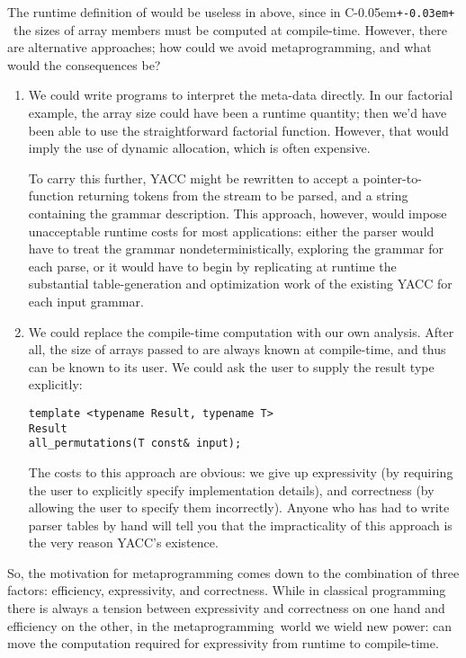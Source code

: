 \documentclass{netobjectdays}
\newcommand{\Cpp}{C\kern-0.05em\texttt{+\kern-0.03em+}%
}
\newcommand{\mping}{meta\-program\-ming}
\begin{document}
The runtime definition of  would be useless in
 above, since in \Cpp\ the sizes of array
members must be computed at compile-time. However, there are
alternative approaches; how could we avoid \mping, and what would the
consequences be?

\begin{enumerate}

\item We could write programs to interpret the meta-data directly. In
  our factorial example, the array size could have been a runtime
  quantity; then we'd have been able to use the straightforward
  factorial function. However, that would imply the use of dynamic
  allocation, which is often expensive.

  To carry this further, YACC might be rewritten to accept a
  pointer-to-function returning tokens from the stream to be parsed,
  and a string containing the grammar description. This approach,
  however, would impose unacceptable runtime costs for most
  applications: either the parser would have to treat the grammar
  nondeterministically, exploring the grammar for each parse, or it
  would have to begin by replicating at runtime the substantial
  table-generation and optimization work of the existing YACC for each
  input grammar.

\item We could replace the compile-time computation with our own
  analysis. After all, the size of arrays passed to
   are always known at compile-time, and
  thus can be known to its user. We could ask the user to supply the
  result type explicitly: {\footnotesize
  \begin{verbatim}
template <typename Result, typename T>
Result
all_permutations(T const& input);
  \end{verbatim}
  }
  The costs to this approach are obvious: we give up expressivity (by
  requiring the user to explicitly specify implementation details),
  and correctness (by allowing the user to specify them
  incorrectly). Anyone who has had to write parser tables by hand will
  tell you that the impracticality of this approach is the very reason
  YACC's existence.
\end{enumerate}

So, the motivation for \mping{} comes down to the combination of three
factors: efficiency, expressivity, and correctness. While in classical
programming there is always a tension between expressivity and
correctness on one hand and efficiency on the other, in the \mping\
world we wield new power: can move the computation required for
expressivity from runtime to compile-time.
\end{document}
